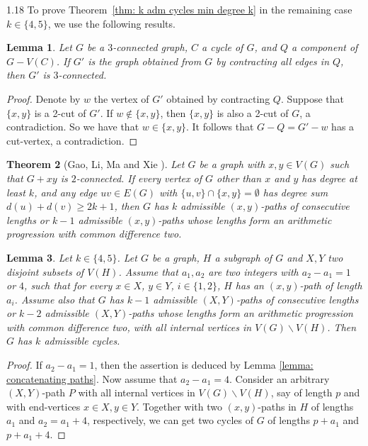 \documentclass[10pt]{article}
\newtheorem{theorem}{Theorem}[section]
\newtheorem{lemma}[theorem]{Lemma}
\begin{document}
\begin{spacing}{1.18}
To prove Theorem~\ref{thm: k adm cycles min degree k} in the remaining case $k \in \{4,5\}$, we use the following results.

\begin{lemma}\label{Le3ConnectedContract}
    Let $G$ be a $3$-connected graph, $C$ a cycle of $G$, and $Q$ a component of $G-V(C)$. If $G'$ is the graph obtained from $G$ by contracting all edges in $Q$, then $G'$ is $3$-connected.
\end{lemma}

\begin{proof}
    Denote by $w$ the vertex of $G'$ obtained by contracting $Q$. Suppose that $\{x,y\}$ is a 2-cut of $G'$. If $w\notin\{x,y\}$, then $\{x,y\}$ is also a 2-cut of $G$, a contradiction. So we have that $w\in\{x,y\}$. It follows that $G-Q=G'-w$ has a cut-vertex, a contradiction.
\end{proof}

\begin{theorem}[Gao, Li, Ma and Xie \cite{GLMX}]\label{thm: adm paths degree sum}
    Let $G$ be a graph with $x,y\in V(G)$ such that $G+xy$ is $2$-connected. If every vertex of $G$ other than $x$ and $y$ has degree at least $k$, and any edge $uv\in E(G)$ with $\{u,v\}\cap \{x, y\}=\emptyset$ has degree sum $d(u)+d(v)\geqslant 2k+1$, then $G$ has $k$ admissible $(x,y)$-paths of consecutive lengths or $k-1$ admissible $(x,y)$-paths whose lengths form an arithmetic progression with common difference two.
\end{theorem}

\begin{lemma}\label{lemma: concatenating paths a1a2k}
    Let $k\in\{4,5\}$. Let $G$ be a graph, $H$ a subgraph of $G$ and $X,Y$ two disjoint subsets of $V(H)$. Assume that $a_1,a_2$ are two integers with $a_2-a_1=1$ or $4$, such that for every $x\in X$, $y\in Y$, $i\in \{1,2\}$, $H$ has an $(x,y)$-path of length $a_i$. Assume also that $G$ has $k-1$ admissible $(X,Y)$-paths of consecutive lengths or $k-2$ admissible $(X,Y)$-paths whose lengths form an arithmetic progression with common difference two, with all internal vertices in $V(G)\backslash V(H)$. Then $G$ has $k$ admissible cycles.
\end{lemma}

\begin{proof}
    If $a_2-a_1=1$, then the assertion is deduced by Lemma \ref{lemma: concatenating paths}. Now assume that $a_2-a_1=4$. Consider an arbitrary $(X,Y)$-path $P$ with all internal vertices in $V(G)\backslash V(H)$, say of length $p$ and with end-vertices $x\in X, y\in Y$. Together with two $(x,y)$-paths in $H$ of lengths $a_1$ and $a_2=a_1+4$, respectively, we can get two cycles of $G$ of lengths $p+a_1$ and $p+a_1+4$. 


\end{proof}
\end{spacing}
\end{document}
